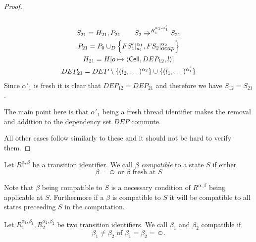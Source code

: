 \begin{proof}
\begin{description}
\begin{equation}
\begin{gathered}
        \end{gathered}
      \end{equation}
      \begin{equation} 
        \begin{gathered}
          S_{21} = H_{21}, P_{21} \quad\quad S_2 \Rrightarrow^{R_1^{\alpha_1,
          \alpha'_1}} S_{21}
          \\
          P_{21} = P_0 \cup_D \left\{ FS'_1|_{a_1}^{\alpha_1},
          FS_2|_{\mbox{$ocap$}}^{\alpha_2} \right\} \\
          H_{21} = H[o \mapsto \mbox{$\langle \mbox{$\mathsf{Cell}$}{}, DEP_{12}, l \rangle$}] \\ 
          DEP_{21} = DEP \setminus \{ (l_2, \dots)^{\alpha_2} \} \cup \{ (l_1,
          \dots)^{\alpha'_1} \} 
        \end{gathered}
      \end{equation}
      Since $\alpha'_1$ is fresh it is clear that $DEP_{12} = DEP_{21}$ and
      therefore we have $S_{12} = S_{21}$.
      \begin{remark}
        The main point here is that $\alpha'_1$ being a fresh thread identifier
        makes the removal and addition to the dependency set $DEP$ commute.
      \end{remark}
  \end{description}
  All other cases follow similarly to these and it should not be hard to verify
  them.
\end{proof}

\begin{definition} \label{def:betacompat}
  Let $R^{\alpha, \beta}$ be a transition
  identifier. We call $\beta$ \emph{compatible} to a state $S$ if either
  \begin{equation*}
    \beta = \smiley \text{ or } \beta \text{ fresh at } S
  \end{equation*}
\end{definition}
\begin{remark}
  Note that $\beta$ being compatible to $S$ is a necessary condition of
  $R^{\alpha, \beta}$ being applicable at $S$. Furthermore if a $\beta$ is
  compatible to $S$ it will be compatible to all states preceeding $S$ in the
  computation.
\end{remark}

\begin{definition}
  Let $R_1^{\alpha_1, \beta_1}, R_2^{\alpha_2, \beta_2}$ be two transition
  identifiers. We call $\beta_1$ and $\beta_2$ compatible if
  \begin{equation*}
    \beta_1 \neq \beta_2 \text{ of } \beta_1 = \beta_2 = \smiley.
  \end{equation*}
\end{definition}


